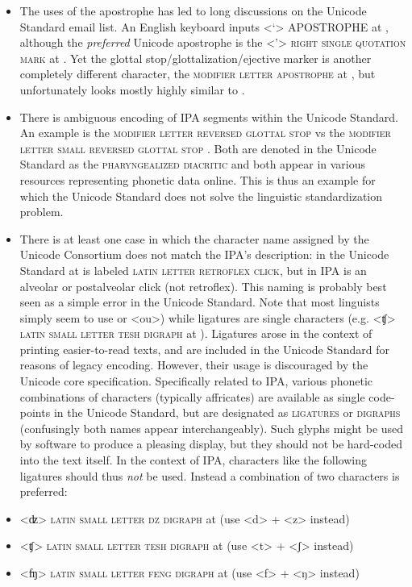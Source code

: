 \begin{itemize}
	\item The uses of the apostrophe has led to long discussions on the Unicode Standard email list. An English keyboard inputs \textless{}`\textgreater{} APOSTROPHE at , although the \textit{preferred} Unicode apostrophe is the \textless{}'\textgreater{} \textsc{right single quotation mark} at . Yet the glottal stop/glottalization/ejective marker is another completely different character, the \textsc{modifier letter apostrophe} at , but unfortunately looks mostly highly similar to . 
	\item There is ambiguous encoding of IPA segments within the Unicode Standard. An example is the  \textsc{modifier letter reversed glottal stop} vs the  \textsc{modifier letter small reversed glottal stop} . Both are denoted in the Unicode Standard as the \textsc{pharyngealized diacritic} and both appear in various resources representing phonetic data online. This is thus an example for which the Unicode Standard does not solve the linguistic standardization problem. 
	\item There is at least one case in which the character name assigned by the Unicode Consortium does not match the IPA's description: in the Unicode Standard at  is labeled \textsc{latin letter retroflex click}, but in IPA is an alveolar or postalveolar click (not retroflex). This naming is probably best seen as a simple error in the Unicode Standard. Note that most linguists simply seem to use or <ou>) while ligatures are single characters (e.g. <ʧ> \textsc{latin small letter tesh digraph} at ). Ligatures arose in the context of printing easier-to-read texts, and are included in the Unicode Standard for reasons of legacy encoding. However, their usage is discouraged by the Unicode core specification. Specifically related to IPA, various phonetic combinations of characters (typically affricates) are available as single code-points in the Unicode Standard, but are designated as \textsc{ligatures} or \textsc{digraphs} (confusingly both names appear interchangeably). Such glyphs might be used by software to produce a pleasing display, but they should not be hard-coded into the text itself. In the context of IPA, characters like the following ligatures should thus \emph{not} be used. Instead a combination of two characters is preferred: 
	\item <ʣ> \textsc{latin small letter dz digraph} at  (use <d> + <z> instead) 
	\item <ʧ> \textsc{latin small letter tesh digraph} at  (use <t> + <ʃ> instead) 
	\item <ʩ> \textsc{latin small letter feng digraph} at  (use <f> + <ŋ> instead) 
\end{itemize}

